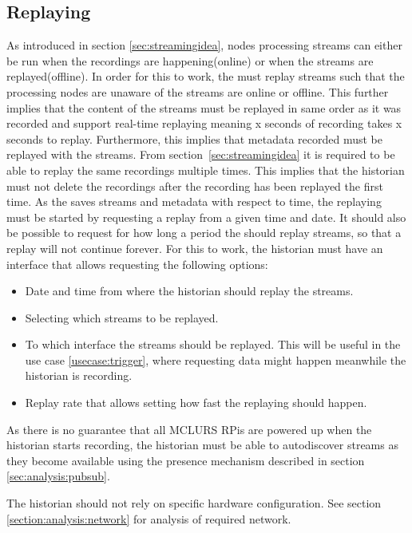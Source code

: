 \subsection{Replaying}
As introduced in section \ref{sec:streamingidea}, nodes processing streams can either be run when the recordings are happening(online) or when the streams are replayed(offline). In order for this to work, the  must replay streams such that the processing nodes are unaware of the streams are online or offline. This further implies that the content of the streams must be replayed in same order as it was recorded and support real-time replaying meaning x seconds of recording takes x seconds to replay. Furthermore, this implies that metadata recorded must be replayed with the streams. From section~\ref{sec:streamingidea} it is required to be able to replay the same recordings multiple times. This implies that the historian must not delete the recordings after the recording has been replayed the first time.
As the  saves streams and metadata with respect to time, the replaying must be started by requesting a replay from a given time and date. It should also be possible to request for how long a period the  should replay streams, so that a replay will not continue forever. For this to work, the historian must have an interface that allows requesting the following options:

\begin{itemize}
	\item Date and time from where the historian should replay the streams.
	\item Selecting which streams to be replayed.
	\item To which interface the streams should be replayed. This will be useful in the use case \ref{usecase:trigger}, where requesting data might happen meanwhile the historian is recording.
	\item Replay rate that allows setting how fast the replaying should happen. 
\end{itemize}

As there is no guarantee that all \ac{MCLURS} RPis are powered up when the historian starts recording, the historian must be able to autodiscover streams as they become available using the presence mechanism described in section \ref{sec:analysis:pubsub}.

The historian should not rely on specific hardware configuration. See section \ref{section:analysis:network} for analysis of required network.


